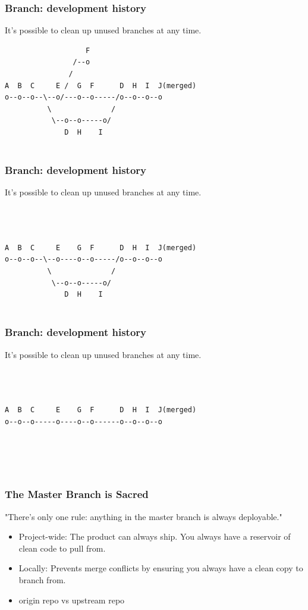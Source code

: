 \documentclass[unknownkeysallowed]{beamer}
\begin{document}
\begin{frame}[fragile]
	\frametitle{Branch: development history}
	It's possible to clean up unused branches at any time.
\begin{verbatim}
                   F
                /--o
               /
A  B  C     E /  G  F      D  H  I  J(merged)
o--o--o--\--o/---o--o-----/o--o--o--o
          \              /
           \--o--o-----o/
              D  H    I
                      
\end{verbatim}
\end{frame}

\begin{frame}[fragile]
	\frametitle{Branch: development history}
	It's possible to clean up unused branches at any time.
\begin{verbatim}
                   
                
               
A  B  C     E    G  F      D  H  I  J(merged)
o--o--o--\--o----o--o-----/o--o--o--o
          \              /
           \--o--o-----o/
              D  H    I
                      
\end{verbatim}
\end{frame}

\begin{frame}[fragile]
	\frametitle{Branch: development history}
	It's possible to clean up unused branches at any time.
\begin{verbatim}
                   
                
               
A  B  C     E    G  F      D  H  I  J(merged)
o--o--o-----o----o--o------o--o--o--o
          
          
          
                      
\end{verbatim}
\end{frame}

\begin{frame}
    \frametitle{The Master Branch is Sacred}
    "There's only one rule: anything in the master branch is always deployable."
    \vspace{0.25cm}
    \begin{itemize}
        \item{Project-wide: The product can always ship. You always have a reservoir of clean code to pull from.}
        \item{Locally: Prevents merge conflicts by ensuring you always have a clean copy to branch from.}
        \item{origin repo vs upstream repo}
    \end{itemize}
\end{frame}
\end{document}
